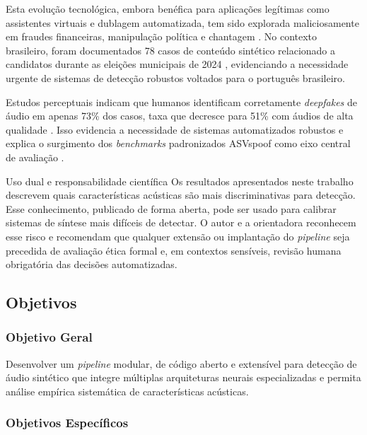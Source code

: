 \documentclass[12pt,a4paper]{article}
\begin{document}
Esta evolução tecnológica, embora benéfica para aplicações legítimas como
assistentes virtuais e dublagem automatizada, tem sido explorada maliciosamente
em fraudes financeiras, manipulação política e chantagem
\cite{pindrop2025, dfrlab2024}. No contexto brasileiro, foram documentados 78
casos de conteúdo sintético relacionado a candidatos durante as eleições
municipais de 2024 \cite{farrugia2024}, evidenciando a necessidade urgente de
sistemas de detecção robustos voltados para o português brasileiro.

Estudos perceptuais indicam que humanos identificam corretamente
\textit{deepfakes} de áudio em apenas 73\% dos casos, taxa que decresce para
51\% com áudios de alta qualidade \cite{muller2022warning}. Isso evidencia a
necessidade de sistemas automatizados robustos e explica o surgimento dos
\textit{benchmarks} padronizados ASVspoof como eixo central de avaliação
\cite{todisco2019asvspoof, yamagishi2021asvspoof, wang2024asvspoof5}.

\begin{warningbox}{Uso dual e responsabilidade científica}
Os resultados apresentados neste trabalho descrevem quais características
acústicas são mais discriminativas para detecção. Esse conhecimento, publicado
de forma aberta, pode ser usado para calibrar sistemas de síntese mais difíceis
de detectar. O autor e a orientadora reconhecem esse risco e recomendam que
qualquer extensão ou implantação do \textit{pipeline} seja precedida de
avaliação ética formal e, em contextos sensíveis, revisão humana obrigatória
das decisões automatizadas.
\end{warningbox}

\subsection{Objetivos}

\subsubsection{Objetivo Geral}

Desenvolver um \textit{pipeline} modular, de código aberto e extensível para
detecção de áudio sintético que integre múltiplas arquiteturas neurais
especializadas e permita análise empírica sistemática de características
acústicas.

\subsubsection{Objetivos Específicos}
\end{document}
